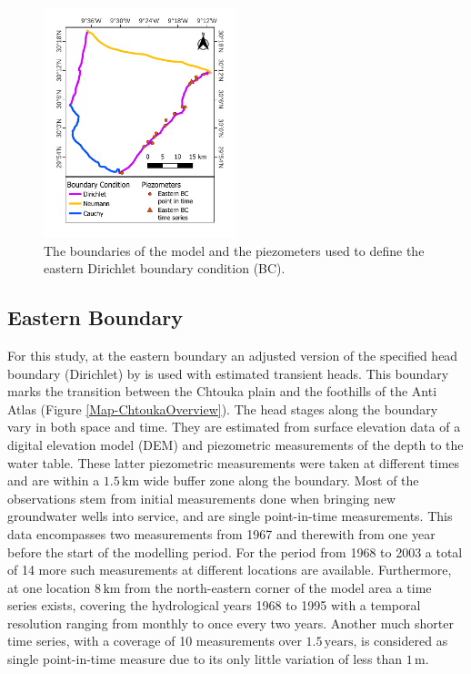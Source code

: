 \begin{figure}
    \vspace{-16pt}
    \centering
    \includegraphics[width=0.5\textwidth]{./img/Map_BoundaryConditions.pdf}
    \vspace{-30pt}
    \captionsetup{format=plain, labelfont=bf, textfont=it}
    \caption{The boundaries of the model and the piezometers used to define the eastern Dirichlet boundary condition (BC).}
    \vspace{-36pt}
    \label{Map-BCOverview}
\end{figure}

\subsection{Eastern Boundary}

For this study, at the eastern boundary an adjusted version of the specified head boundary (Dirichlet) by \textcite{Horn.2021} is used with estimated transient heads. 
This boundary marks the transition between the Chtouka plain and the foothills of the Anti Atlas (Figure \ref{Map-ChtoukaOverview}). 
The head stages along the boundary vary in both space and time. 
They are estimated from surface elevation data of a digital elevation model (DEM) \parencite{NASA.SRTM1Arc} and piezometric measurements of the depth to the water table. 
These latter piezometric measurements were taken at different times and are within a $1.5 \, \textrm{km}$ wide buffer zone along the boundary. 
Most of the observations stem from initial measurements done when bringing new groundwater wells into service, and are single point-in-time measurements. 
This data encompasses two measurements from 1967 and therewith from one year before the start of the modelling period. 
For the period from 1968 to 2003 a total of 14 more such measurements at different locations are available. 
Furthermore, at one location $8 \, \textrm{km}$ from the north-eastern corner of the model area a time series exists, covering the hydrological years 1968 to 1995 with a temporal resolution ranging from monthly to once every two years. 
Another much shorter time series, with a coverage of 10 measurements over $1.5 \, \textrm{years}$, is considered as single point-in-time measure due to its only little variation of less than $1 \, \textrm{m}$.

